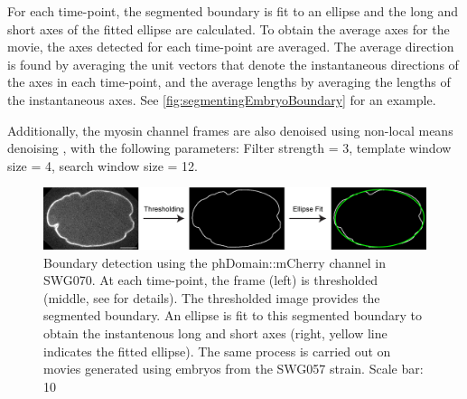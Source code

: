For each time-point, the segmented boundary is fit to an ellipse and the long and short axes of the fitted ellipse are calculated. To obtain the average axes for the movie, the axes detected for each time-point are averaged. The average direction is found by averaging the unit vectors that denote the instantaneous directions of the axes in each time-point, and the average lengths by averaging the lengths of the instantaneous axes. See \autoref{fig:segmentingEmbryoBoundary} for an example.

Additionally, the myosin channel frames are also denoised using non-local means denoising \citep{buades2011non}, with the following parameters: Filter strength = \SI{3}{\pixels}, template window size = \SI{4}{\pixels}, search window size = \SI{12}{\pixels}. 

\begin{figure}[h]
\centering
\includegraphics[width=\textwidth]{ExpMethods/FigTrackingPipeline/boundaryDetect.png}
\caption[Image analysis: Segmenting embryo boundary]{Boundary detection using the phDomain::mCherry channel in SWG070. At each time-point, the frame (left) is thresholded (middle, see  for details). The thresholded image provides the segmented boundary. An ellipse is fit to this segmented boundary to obtain the instantenous long and short axes (right, yellow line indicates the fitted ellipse). The same process is carried out on movies generated using embryos from the SWG057 strain. Scale bar: \SI{10}{\unitLength}}
\label{fig:segmentingEmbryoBoundary}
\end{figure}

